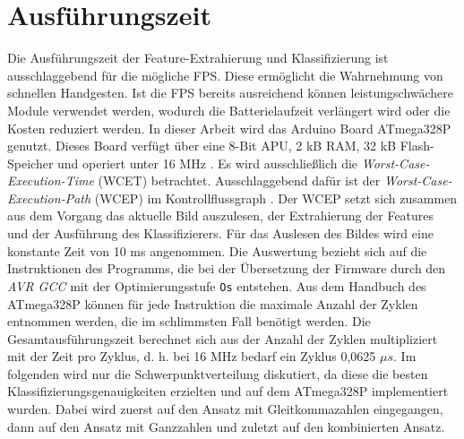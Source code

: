 \section{Ausführungszeit}
\label{sec:eval_speed}
Die Ausführungszeit der Feature-Extrahierung und Klassifizierung ist ausschlaggebend für die mögliche FPS. Diese ermöglicht die Wahrnehmung von schnellen Handgesten. Ist die FPS bereits ausreichend
können leistungschwächere Module verwendet werden, wodurch die Batterielaufzeit verlängert wird oder die Kosten reduziert werden.
In dieser Arbeit wird das Arduino Board ATmega328P genutzt. Dieses Board verfügt über eine 8-Bit APU, 2 kB RAM, 32 kB Flash-Speicher und operiert unter 16 MHz \cite{atmega328p}.
\newline
\newline
Es wird ausschließlich die \textit{Worst-Case-Execution-Time} (WCET) betrachtet. Ausschlaggebend dafür ist der \textit{Worst-Case-Execution-Path} (WCEP) im Kontrollflussgraph \cite{wcc_intro}. Der WCEP
setzt sich zusammen aus dem Vorgang das aktuelle Bild auszulesen, der Extrahierung der Features und der Ausführung des Klassifizierers. Für das Auslesen des Bildes wird eine konstante Zeit von 10 ms angenommen.
\newline
\newline
Die Auswertung bezieht sich auf die Instruktionen des Programms, die bei der Übersetzung der Firmware durch den \textit{AVR GCC} mit der Optimierungsstufe \texttt{Os} entstehen. Aus dem Handbuch des
ATmega328P \cite{atmega328p} können für jede Instruktion die maximale Anzahl der Zyklen entnommen werden, die im schlimmsten Fall benötigt werden. Die Gesamtausführungszeit berechnet sich aus der Anzahl der Zyklen
multipliziert mit der Zeit pro Zyklus, d. h. bei 16 MHz bedarf ein Zyklus 0,0625 $\mu s$.
\newline
\newline
Im folgenden wird nur die Schwerpunktverteilung diskutiert, da diese die besten Klassifizierungsgenauigkeiten erzielten und auf dem ATmega328P implementiert wurden. Dabei wird zuerst auf den Ansatz mit Gleitkommazahlen
eingegangen, dann auf den Ansatz mit Ganzzahlen und zuletzt auf den kombinierten Ansatz.




